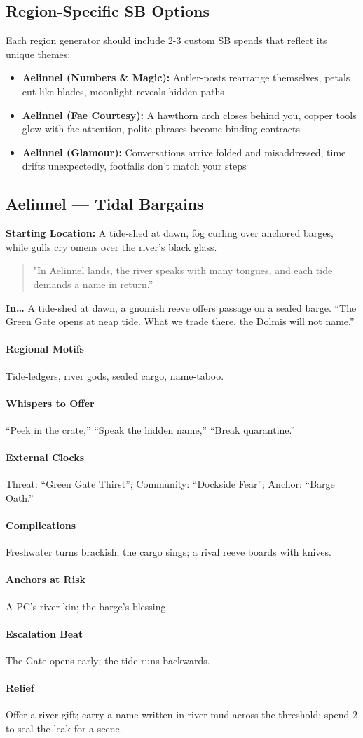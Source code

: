 \subsection*{Region-Specific SB Options}
Each region generator should include 2-3 custom SB spends that reflect its unique themes:

\begin{itemize}
\item \textbf{Aelinnel (Numbers \& Magic):} Antler-posts rearrange themselves, petals cut like blades, moonlight reveals hidden paths
\item \textbf{Aelinnel (Fae Courtesy):} A hawthorn arch closes behind you, copper tools glow with fae attention, polite phrases become binding contracts
\item \textbf{Aelinnel (Glamour):} Conversations arrive folded and misaddressed, time drifts unexpectedly, footfalls don't match your steps
\end{itemize}

\subsection*{Aelinnel — Tidal Bargains}
\textbf{Starting Location:} A tide‑shed at dawn, fog curling over anchored barges, while gulls cry omens over the river’s black glass.
\begin{quote}
"In Aelinnel lands, the river speaks with many tongues, and each tide demands a name in return.”
\end{quote}

\textbf{In…} A tide-shed at dawn, a gnomish reeve offers passage on a sealed barge. ``The Green Gate opens at neap tide. What we trade there, the Dolmis will not name.''
\paragraph{Regional Motifs} Tide-ledgers, river gods, sealed cargo, name-taboo.
\paragraph{Whispers to Offer} ``Peek in the crate,'' ``Speak the hidden name,'' ``Break quarantine.''
\paragraph{External Clocks} Threat: ``Green Gate Thirst''; Community: ``Dockside Fear''; Anchor: ``Barge Oath.''
\paragraph{Complications} Freshwater turns brackish; the cargo sings; a rival reeve boards with knives.
\paragraph{Anchors at Risk} A PC’s river-kin; the barge’s blessing.
\paragraph{Escalation Beat} The Gate opens early; the tide runs backwards.
\paragraph{Relief} Offer a river-gift; carry a name written in river-mud across the threshold; spend 2 \Boons{} to seal the leak for a scene.

